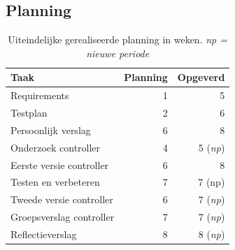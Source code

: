 \documentclass{article}
\begin{document}
\pagebreak
\subsection{Planning}
\label{uiteind-plan}
\begin{table}[h!]
\begin{tabular}{lrr}
 \textbf{Taak} & \textbf{Planning} & \textbf{Opgeverd} \\ \hline
 Requirements & 1 & 5 \\
 Testplan & 2 & 6 \\
 Persoonlijk verslag & 6 & 8 \\
 Onderzoek controller & 4 & 5 (\textit{np}) \\
 Eerste versie controller & 6 & 8 \\
 Testen en verbeteren & 7 & 7 (np) \\
 Tweede versie controller & 6 & 7 (\textit{np}) \\
 Groepsverslag controller & 7 & 7 (\textit{np}) \\
 Reflectieverslag & 8 & 8 (\textit{np})  \\
\end{tabular}
\caption{Uiteindelijke gerealiseerde planning in weken. \textit{np = nieuwe periode}}
\end{table}
\newpage


%

\end{document}
